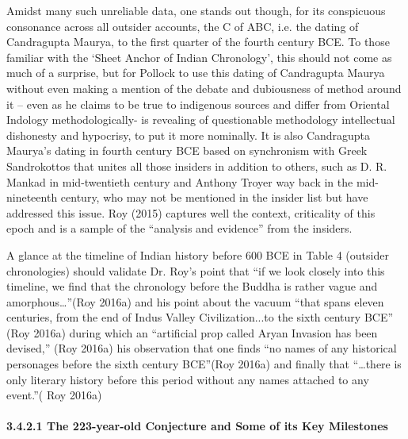 Amidst many such unreliable data, one stands out though, for its conspicuous consonance across all outsider accounts, the C of ABC, i.e. the dating of Candragupta Maurya, to the first quarter of the fourth century BCE. To those familiar with the ‘Sheet Anchor of Indian Chronology’, this should not come as much of a surprise, but for Pollock to use this dating of Candragupta Maurya without even making a mention of the debate and dubiousness of method around it – even as he claims to be true to indigenous sources and differ from Oriental Indology methodologically- is revealing of questionable methodology intellectual dishonesty and hypocrisy, to put it more nominally. It is also Candragupta Maurya’s dating in fourth century BCE based on synchronism with Greek Sandrokottos that unites all those insiders in addition to others, such as D. R. Mankad in mid-twentieth century and Anthony Troyer way back in the mid-nineteenth century, who may not be mentioned in the insider list but have addressed this issue. Roy (2015) captures well the context, criticality of this epoch and is a sample of the “analysis and evidence” from the insiders.

A glance at the timeline of Indian history before 600 BCE in Table 4 (outsider chronologies) should validate Dr. Roy’s point that “if we look closely into this timeline, we find that the chronology before the Buddha is rather vague and amorphous…”(Roy 2016a) and his point about the vacuum “that spans eleven centuries, from the end of Indus Valley Civilization...to the sixth century BCE” (Roy 2016a) during which an “artificial prop called Aryan Invasion has been devised,” (Roy 2016a) his observation that one finds “no names of any historical personages before the sixth century BCE”(Roy 2016a) and finally that “…there is only literary history before this period without any names attached to any event.”( Roy 2016a)


\paragraph*{3.4.2.1 The 223-year-old Conjecture and Some of its Key Milestones}

